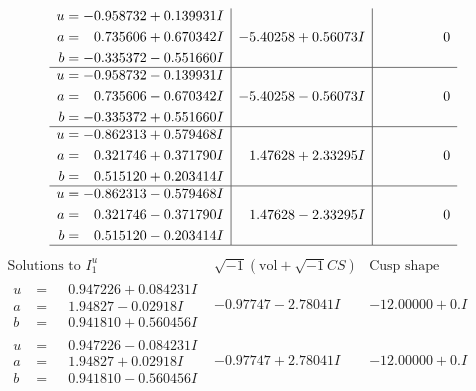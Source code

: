 \documentclass[1p]{elsarticle_modified}
\theoremstyle{definition}
\newcommand{\I}{\sqrt{-1}}
\begin{document}
$$\begin{array}{c|c|c}
\begin{aligned}
u &= -0.958732 + 0.139931 I \\
a &= \phantom{-}0.735606 + 0.670342 I \\
b &= -0.335372 - 0.551660 I\end{aligned}
 & -5.40258 + 0.56073 I & \phantom{-0.000000 } 0 \\ \hline\begin{aligned}
u &= -0.958732 - 0.139931 I \\
a &= \phantom{-}0.735606 - 0.670342 I \\
b &= -0.335372 + 0.551660 I\end{aligned}
 & -5.40258 - 0.56073 I & \phantom{-0.000000 } 0 \\ \hline\begin{aligned}
u &= -0.862313 + 0.579468 I \\
a &= \phantom{-}0.321746 + 0.371790 I \\
b &= \phantom{-}0.515120 + 0.203414 I\end{aligned}
 & \phantom{-}1.47628 + 2.33295 I & \phantom{-0.000000 } 0 \\ \hline\begin{aligned}
u &= -0.862313 - 0.579468 I \\
a &= \phantom{-}0.321746 - 0.371790 I \\
b &= \phantom{-}0.515120 - 0.203414 I\end{aligned}
 & \phantom{-}1.47628 - 2.33295 I & \phantom{-0.000000 } 0\\
 \hline 
 \end{array}$$\newpage$$\begin{array}{c|c|c}  
\text{Solutions to }I^u_{1}& \I (\text{vol} + \sqrt{-1}CS) & \text{Cusp shape}\\
 \hline 
\begin{aligned}
u &= \phantom{-}0.947226 + 0.084231 I \\
a &= \phantom{-}1.94827 - 0.02918 I \\
b &= \phantom{-}0.941810 + 0.560456 I\end{aligned}
 & -0.97747 - 2.78041 I & -12.00000 + 0. I\phantom{ +0.000000I} \\ \hline\begin{aligned}
u &= \phantom{-}0.947226 - 0.084231 I \\
a &= \phantom{-}1.94827 + 0.02918 I \\
b &= \phantom{-}0.941810 - 0.560456 I\end{aligned}
 & -0.97747 + 2.78041 I & -12.00000 + 0. I\phantom{ +0.000000I} \\ \hline\begin{aligned}

\end{aligned}
\end{array}$$
\end{document}
